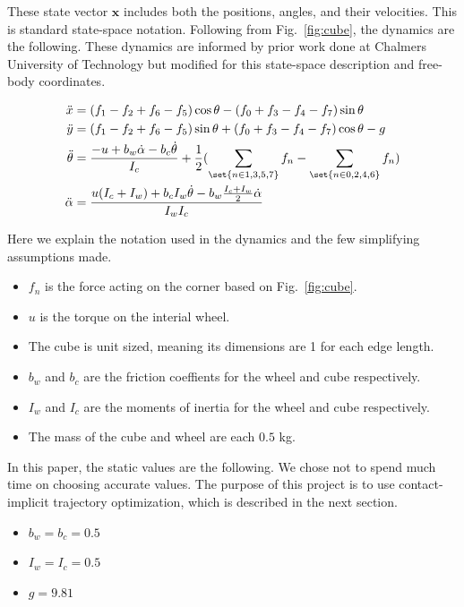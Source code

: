 \documentclass[conference]{IEEEtran}
\begin{document}
These state vector $\textbf{x}$ includes both the positions, angles, and their velocities. This is standard state-space notation. Following from Fig.~\ref{fig:cube}, the dynamics are the following. These dynamics are informed by prior work done at Chalmers University of Technology \cite{b4} but modified for this state-space description and free-body coordinates.

\begin{align}
\ddot x &= (f_{1}-f_{2}+f_{6}-f_{5})\cos{\theta} - (f_{0}+f_{3}-f_{4}-f_{7})\sin{\theta} \\
\ddot y &= (f_{1}-f_{2}+f_{6}-f_{5})\sin{\theta} + (f_{0}+f_{3}-f_{4}-f_{7})\cos{\theta}-g \\
\ddot \theta &= \frac{-u + b_{w}\dot\alpha - b_{c}\dot\theta}{I_c} + \frac{1}{2}(\sum_{\set{n\in{1,3,5,7}}} f_{n} - \sum_{\set{n\in{0,2,4,6}}} f_{n}) \\
\ddot \alpha &= \frac{u(I_{c}+I_{w}) + b_{c}I_{w}\dot\theta - b_{w}\frac{I_{c}+I_{w}}{2}\dot\alpha}{I_{w}I_{c}}
\end{align}

Here we explain the notation used in the dynamics and the few simplifying assumptions made.

\begin{itemize}
\item $f_{n}$ is the force acting on the corner based on Fig.~\ref{fig:cube}.
\item $u$ is the torque on the interial wheel.
\item The cube is unit sized, meaning its dimensions are 1 for each edge length.
\item $b_{w}$ and $b_{c}$ are the friction coeffients for the wheel and cube respectively.
\item $I_{w}$ and $I_{c}$ are the moments of inertia for the wheel and cube respectively.
\item The mass of the cube and wheel are each $0.5$ kg.
\end{itemize}

In this paper, the static values are the following. We chose not to spend much time on choosing accurate values. The purpose of this project is to use contact-implicit trajectory optimization, which is described in the next section.

\begin{itemize}
\item $b_{w} = b_{c} = 0.5$
\item $I_{w} = I_{c} = 0.5$
\item $g = 9.81$
\end{itemize}
\end{document}
